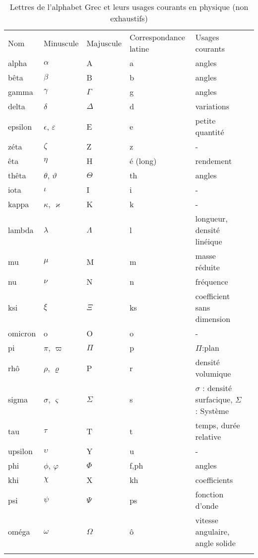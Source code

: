 \begin{table}[!h]
\centering
\begin{tabular}{M{1.75cm}M{1.75cm}M{1.75cm}M{3.75cm}M{3.75cm}N}
\hhline{=====}
Nom & Minuscule & Majuscule & Correspondance latine & Usages courants &\\[2em]
\hhline{=====}
alpha & $\alpha$ & A & a & angles & \\[0.5em]
\hline
bêta  & $\beta$  & B  & b & angles & \\[0.5em]
\hline
gamma & $\gamma$ & $\Gamma$ & g & angles & \\[0.5em]
\hline
delta & $\delta$ & $\Delta$ & d & variations & \\[0.5em]
\hline
epsilon & $\epsilon$, $\varepsilon$ & E & e & petite quantité & \\[0.5em]
\hline
zéta & $\zeta$ & Z & z & -  & \\[0.5em]
\hline
êta & $\eta$ & H & é (long) & rendement & \\[0.5em]
\hline
thêta & $\theta$, $\vartheta$  & $\Theta$ & th & angles & \\[0.5em]
\hline
iota & $\iota$ & I & i & - & \\[0.5em]
\hline
kappa & $\kappa$, $\varkappa$ & K & k & - & \\[0.5em]
\hline
lambda & $\lambda$ & $\Lambda$ & l & longueur, densité linéique & \\[0.5em]
\hline
mu & $\mu$ & M & m & masse réduite & \\[0.5em]
\hline
nu & $\nu$ & N & n & fréquence & \\[0.5em]
\hline
ksi & $\xi$ & $\Xi$ & ks & coefficient sans dimension & \\[0.5em]
\hline
omicron & o & O & o & - & \\[0.5em]
\hline
pi & $\pi$, $\varpi$ & $\Pi$ & p & $\Pi$:plan & \\[0.5em]
\hline
rhô & $\rho$, $\varrho$ & P & r & densité volumique & \\[0.5em]
\hline
sigma & $\sigma$, 
        $\varsigma$ & $\Sigma$ & s & $\sigma$ : densité surfacique, 
                                     $\Sigma$ : Système  & \\[0.5em]
\hline
tau & $\tau$ & T & t & temps, durée relative  & \\[0.5em]
\hline
upsilon & $\upsilon$ & Y & u & -  & \\[0.5em]
\hline
phi & $\phi$, $\varphi$ & $\Phi$ & f,ph & angles   & \\[0.5em]
\hline
khi & $\chi$ & X  & kh & coefficients   & \\[0.5em]
\hline
psi & $\psi$ & $\Psi$ & ps & fonction d'onde   & \\[0.5em]
\hline
oméga & $\omega$ & $\Omega$ & ô & vitesse angulaire, angle solide   & \\[0.5em]
\hhline{=====}
\end{tabular}
\caption{Lettres de l'alphabet Grec et leurs usages courants 
         en physique (non exhaustifs)}
\end{table}

